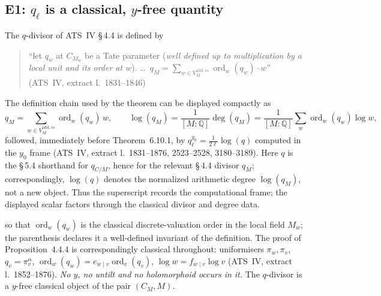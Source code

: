 \documentclass[11pt,a4paper]{article}
\theoremstyle{definition}
\theoremstyle{plain}
\theoremstyle{definition}
\newcommand{\ordd}{\operatorname{ord}}
\newcommand{\anchor}[2]{(#1, extract l.~#2)}
\begin{document}
\subsection{E1: \texorpdfstring{$q_\ell$}{q\_l} is a classical, \texorpdfstring{$y$}{y}-free quantity}

The $q$-divisor of ATS~IV \S\,4.4 is defined by

\begin{quote}\small
``let $q_w$ at $C_{M_w}$ be a Tate parameter (\emph{well defined up to
multiplication by a local unit and its order at $w$}). \ldots\
$q_M = \sum_{w \in V^{\mathrm{odd},ss}_M} \ordd_w(q_w) \cdot w$''
\hfill\anchor{ATS~IV}{1831--1846}
\end{quote}

The definition chain used by the theorem can be displayed compactly as
\[
 q_M=\sum_{w\in V_M^{\mathrm{odd},ss}}\ordd_w(q_w)\,w,
 \qquad
 \log(q_M)=\frac{1}{[M:\mathbb{Q}]}\deg(q_M)
 =\frac{1}{[M:\mathbb{Q}]}
   \sum_w \ordd_w(q_w)\log w,
\]
followed, immediately before Theorem~6.10.1, by
$q_\ell^{y_0}=\tfrac{1}{2\ell}\log(q)$ computed in the $y_0$ frame
\anchor{ATS~IV}{1831--1876, 2523--2528, 3180--3189}. Here $q$ is the
\S\,5.4 shorthand for $q_{C/M}$, hence for the relevant \S\,4.4 divisor
$q_M$; correspondingly, $\log(q)$ denotes the normalized arithmetic degree
$\log(q_M)$, not a new object. Thus the superscript records the
computational frame; the displayed scalar factors through the classical divisor
and degree data.

so that $\ordd_w(q_w)$ is the classical discrete-valuation order in the local
field $M_w$; the parenthesis declares it a well-defined invariant of the
definition. The proof of Proposition~4.4.4 is correspondingly classical
throughout: uniformisers $\pi_w, \pi_v$, $q_v = \pi_v^\alpha$,
$\ordd_w(q_w) = e_{w\mid v}\ordd_v(q_v)$, $\log w = f_{w\mid v}\log v$
\anchor{ATS~IV}{1852--1876}. \emph{No $y$, no untilt and no holomorphoid occurs in
it.} The $q$-divisor is a $y$-free classical object of the pair $(C_M, M)$.
\end{document}
